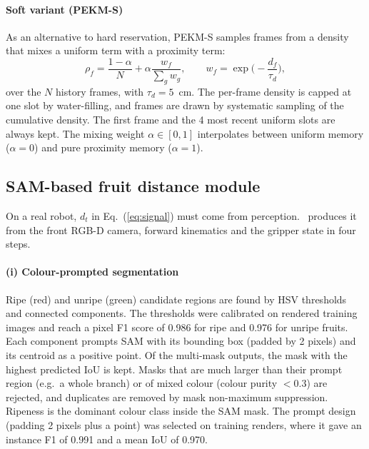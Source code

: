 \paragraph{Soft variant (PEKM-S)} As an alternative to hard reservation, PEKM-S samples frames from a density that mixes a uniform term with a proximity term:
\begin{equation}
\rho_f = \frac{1-\alpha}{N} + \alpha \frac{w_f}{\sum_g w_g},\qquad w_f = \exp\!\Big(-\frac{d_f}{\tau_d}\Big),
\label{eq:soft}
\end{equation}
over the $N$ history frames, with $\tau_d=5$~cm. The per-frame density is capped at one slot by water-filling, and frames are drawn by systematic sampling of the cumulative density. The first frame and the 4 most recent uniform slots are always kept. The mixing weight $\alpha \in [0,1]$ interpolates between uniform memory ($\alpha=0$) and pure proximity memory ($\alpha=1$).

\subsection{SAM-based fruit distance module}
\label{sec:fdm}
On a real robot, $d_t$ in Eq.~(\ref{eq:signal}) must come from perception. \fdm\ produces it from the front RGB-D camera, forward kinematics and the gripper state in four steps.

\paragraph{(i) Colour-prompted segmentation} Ripe (red) and unripe (green) candidate regions are found by HSV thresholds and connected components. The thresholds were calibrated on rendered training images and reach a pixel F1 score of 0.986 for ripe and 0.976 for unripe fruits. Each component prompts SAM \citep{kirillov2023sam} with its bounding box (padded by 2 pixels) and its centroid as a positive point. Of the multi-mask outputs, the mask with the highest predicted IoU is kept. Masks that are much larger than their prompt region (e.g.\ a whole branch) or of mixed colour (colour purity $<0.3$) are rejected, and duplicates are removed by mask non-maximum suppression. Ripeness is the dominant colour class inside the SAM mask. The prompt design (padding 2 pixels plus a point) was selected on training renders, where it gave an instance F1 of 0.991 and a mean IoU of 0.970.

